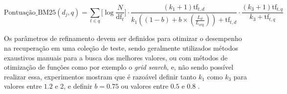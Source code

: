     \begin{equation}
        \label{eq:okapi-bm25-tf-consulta}
		\text{Pontuação\_BM25}(d_j, q) = 
		\sum_{t \in q} 
		\Bigg[ \log{\frac{N}{\text{df}_{t}}} \Bigg]
		\cdot 
		\frac{(k_1 + 1) \text{tf}_{t,d}}{k_1((1-b)+b \times (\frac{L_d}{L_{\text{avg}}})) + \text{tf}_{t,d}} \cdot 
		\frac{(k_3+1) \text{tf}_{t,q}}{k_3 + \text{tf}_{t,q}}
    \end{equation}
    
    Os parâmetros de refinamento devem ser definidos para otimizar o desempenho na recuperação em uma coleção de teste, sendo geralmente utilizados métodos exaustivos manuais para a busca dos melhores valores, ou com métodos de otimização de funções como por exemplo o \textit{grid search}, e, não sendo possível realizar essa, experimentos mostram que é razoável definir tanto $k_1$ como $k_3$ para valores entre $1.2$ e $2$, e definir $b = 0.75$ ou valores entre $0.5$ e $0.8$ \cite[p.~215]{Manning2008IIR} \cite[p.~360--361]{robertson_probabilistic_2010}.
    

